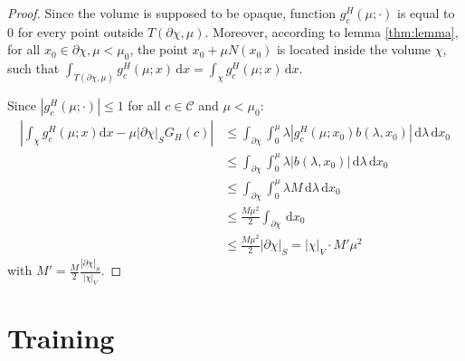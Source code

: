 \begin{proof}
Since the volume is supposed to be opaque, function $g_c^H(\mu;\cdot)$ is equal to 0 for every point outside $T(\partial\chi, \mu)$. Moreover, according to lemma \ref{thm:lemma}, for all $x_0\in \partial \chi, \mu < \mu_0$, the point $x_0 + \mu N(x_0)$ is located inside the volume $\chi$, such that $\int_{T(\partial\chi, \mu)}  g_c^H(\mu;x)\,\text{d}x = \int_{\chi}  g_c^H(\mu;x)\,\text{d}x$.

Since $|g_c^H(\mu;\cdot)|\leq 1$ for all $c\in\mathcal{C}$ and $\mu<\mu_0$:
\begin{equation}
    \begin{split}
        \left| \int_{\chi}  g_c^H(\mu;x) \text{d}x - \mu |\partial\chi|_S G_H(c) \right| & \leq \int_{\partial\chi} \int_{0}^\mu \lambda \left| g_c^H(\mu;x_0) b(\lambda, x_0)\right| \,\text{d}\lambda \,\text{d}x_0 \\
        & \leq \int_{\partial\chi} \int_{0}^\mu \lambda \left|b(\lambda, x_0)\right| \,\text{d}\lambda \,\text{d}x_0\\
        & \leq \int_{\partial\chi} \int_{0}^\mu \lambda M \,\text{d}\lambda \,\text{d}x_0 \\
        & \leq \frac{M\mu^2}{2} \int_{\partial\chi} \,\text{d}x_0 \\
        & \leq \frac{M\mu^2}{2} |\partial\chi|_S = |\chi|_V \cdot M'\mu^2 
    \end{split}
\end{equation}
%
with $M' = \frac{M}{2} \frac{|\partial\chi|_S}{|\chi|_V}$.
\end{proof}
\section{Training}
\label{sec:supp_mat_2_training}

